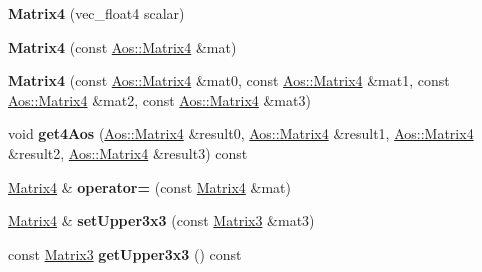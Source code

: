 \begin{DoxyCompactItemize}
\item 
\hypertarget{classVectormath_1_1Soa_1_1Matrix4_af167a23c0213ba518024ecc6bd8bd338}{{\bfseries Matrix4} (vec\-\_\-float4 scalar)}\label{classVectormath_1_1Soa_1_1Matrix4_af167a23c0213ba518024ecc6bd8bd338}

\item 
\hypertarget{classVectormath_1_1Soa_1_1Matrix4_ac3365a909689ae90d54b822779479b9a}{{\bfseries Matrix4} (const \hyperlink{classVectormath_1_1Aos_1_1Matrix4}{Aos\-::\-Matrix4} \&mat)}\label{classVectormath_1_1Soa_1_1Matrix4_ac3365a909689ae90d54b822779479b9a}

\item 
\hypertarget{classVectormath_1_1Soa_1_1Matrix4_a09fb7e3046ffce511f8d505f99650e9a}{{\bfseries Matrix4} (const \hyperlink{classVectormath_1_1Aos_1_1Matrix4}{Aos\-::\-Matrix4} \&mat0, const \hyperlink{classVectormath_1_1Aos_1_1Matrix4}{Aos\-::\-Matrix4} \&mat1, const \hyperlink{classVectormath_1_1Aos_1_1Matrix4}{Aos\-::\-Matrix4} \&mat2, const \hyperlink{classVectormath_1_1Aos_1_1Matrix4}{Aos\-::\-Matrix4} \&mat3)}\label{classVectormath_1_1Soa_1_1Matrix4_a09fb7e3046ffce511f8d505f99650e9a}

\item 
\hypertarget{classVectormath_1_1Soa_1_1Matrix4_aae44182e8d614430b45fad53323f0499}{void {\bfseries get4\-Aos} (\hyperlink{classVectormath_1_1Aos_1_1Matrix4}{Aos\-::\-Matrix4} \&result0, \hyperlink{classVectormath_1_1Aos_1_1Matrix4}{Aos\-::\-Matrix4} \&result1, \hyperlink{classVectormath_1_1Aos_1_1Matrix4}{Aos\-::\-Matrix4} \&result2, \hyperlink{classVectormath_1_1Aos_1_1Matrix4}{Aos\-::\-Matrix4} \&result3) const }\label{classVectormath_1_1Soa_1_1Matrix4_aae44182e8d614430b45fad53323f0499}

\item 
\hypertarget{classVectormath_1_1Soa_1_1Matrix4_a999e70cf71d9198f3af1b0525c3d0934}{\hyperlink{classVectormath_1_1Soa_1_1Matrix4}{Matrix4} \& {\bfseries operator=} (const \hyperlink{classVectormath_1_1Soa_1_1Matrix4}{Matrix4} \&mat)}\label{classVectormath_1_1Soa_1_1Matrix4_a999e70cf71d9198f3af1b0525c3d0934}

\item 
\hypertarget{classVectormath_1_1Soa_1_1Matrix4_a26e563303192d7116d73e17932389bd5}{\hyperlink{classVectormath_1_1Soa_1_1Matrix4}{Matrix4} \& {\bfseries set\-Upper3x3} (const \hyperlink{classVectormath_1_1Soa_1_1Matrix3}{Matrix3} \&mat3)}\label{classVectormath_1_1Soa_1_1Matrix4_a26e563303192d7116d73e17932389bd5}

\item 
\hypertarget{classVectormath_1_1Soa_1_1Matrix4_abc748bbc84bf29ae195feabc80161ef9}{const \hyperlink{classVectormath_1_1Soa_1_1Matrix3}{Matrix3} {\bfseries get\-Upper3x3} () const }\label{classVectormath_1_1Soa_1_1Matrix4_abc748bbc84bf29ae195feabc80161ef9}


\end{DoxyCompactItemize}
